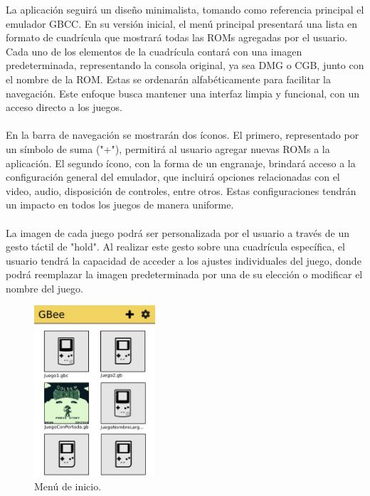 La aplicación seguirá un diseño minimalista, tomando como referencia principal el emulador GBCC. En su versión inicial, el menú principal presentará una lista en formato de cuadrícula que mostrará todas las ROMs agregadas por el usuario. Cada uno de los elementos de la cuadrícula contará con una imagen predeterminada, representando la consola original, ya sea DMG o CGB, junto con el nombre de la ROM. Estas se ordenarán alfabéticamente para facilitar la navegación. Este enfoque busca mantener una interfaz limpia y funcional, con un acceso directo a los juegos.
\\\\
En la barra de navegación se mostrarán dos íconos. El primero, representado por un símbolo de suma ("+"), permitirá al usuario agregar nuevas ROMs a la aplicación. El segundo ícono, con la forma de un engranaje, brindará acceso a la configuración general del emulador, que incluirá opciones relacionadas con el video, audio, disposición de controles, entre otros. Estas configuraciones tendrán un impacto en todos los juegos de manera uniforme.
\\\\
La imagen de cada juego podrá ser personalizada por el usuario a través de un gesto táctil de "hold". Al realizar este gesto sobre una cuadrícula específica, el usuario tendrá la capacidad de acceder a los ajustes individuales del juego, donde podrá reemplazar la imagen predeterminada por una de su elección o modificar el nombre del juego.

\begin{figure}[h]
    \centering
    \includegraphics[width=0.4\textwidth]{include/images/mockup_menu.jpg}
    \caption{Menú de inicio.}
    \label{figure:mockupmenu}
\end{figure}

